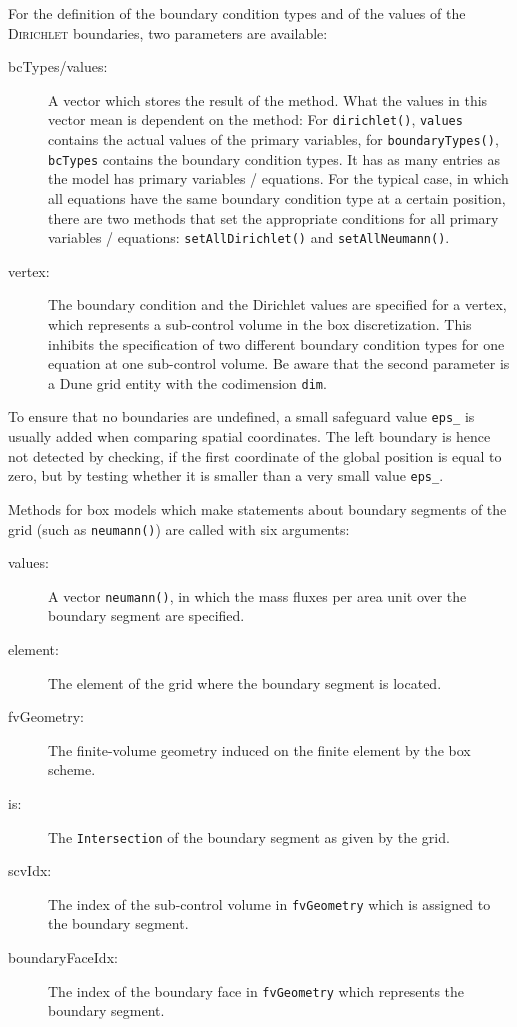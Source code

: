 For the definition of the boundary condition types and of the
values of the \textsc{Dirichlet} boundaries, two parameters are
available:
\begin{description}
 \item [bcTypes/values:]  A vector which stores the result of the method. What
  the values in this vector mean is dependent on the method: For
  \texttt{dirichlet()}, \texttt{values} contains the actual values of the primary
  variables, for \texttt{boundaryTypes()}, \texttt{bcTypes} contains the boundary 
  condition types. It has as many entries as the model has primary variables / equations.
  For the typical case, in which all equations have the same boundary
  condition type at a certain position, there are two methods that set the appropriate conditions
  for all primary variables / equations: \texttt{setAllDirichlet()} and \texttt{setAllNeumann()}.
\item [vertex:] The boundary condition and the Dirichlet values are
  specified for a vertex, which represents a sub-control volume in the box
  discretization. This inhibits the specification of two different
  boundary condition types for one equation at one sub-control
  volume.  Be aware that the second parameter is a Dune grid entity
  with the codimension \texttt{dim}.
\end{description}

To ensure that no boundaries are undefined, a small safeguard value
\texttt{eps\_} is usually added when comparing spatial
coordinates. The left boundary is hence not detected by checking, if the
first coordinate of the global position is equal to zero, but by testing whether it is
smaller than a very small value \texttt{eps\_}.

Methods for box models which make statements about boundary segments of the grid
(such as \texttt{neumann()}) are called with six arguments:
\begin{description}
\item[values:] A vector \texttt{neumann()}, in which the mass fluxes per area unit
  over the boundary segment are specified.
\item[element:] The element of the grid where the boundary segment
  is located.
\item[fvGeometry:] The finite-volume geometry induced on the
  finite element by the box scheme.
\item[is:] The \texttt{Intersection} of the boundary segment as given by the grid.
\item[scvIdx:] The index of the sub-control volume in
  \texttt{fvGeometry} which is assigned to the boundary segment.
\item[boundaryFaceIdx:] The index of the boundary face in
  \texttt{fvGeometry} which represents the boundary segment.  
\end{description}

